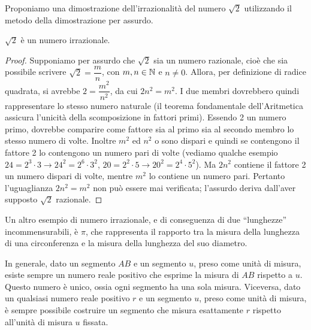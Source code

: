 \begin{enumerate}
Proponiamo una dimostrazione dell'irrazionalità del numero $\sqrt{2}$ utilizzando il metodo della dimostrazione per assurdo.

\begin{teorema}
$\sqrt{2}$ è un numero irrazionale.
\end{teorema}

\begin{proof}
Supponiamo per assurdo che $\sqrt{2}$ sia un numero razionale, cioè che sia possibile scrivere $\sqrt{2}=\dfrac{m}{n}$, con $m,n \in \mathbb{N}$ e $n\neq 0$. Allora, per definizione di radice quadrata, si avrebbe $2=\dfrac{m^2}{n^2}$, da cui $2n^2=m^2$. I due membri dovrebbero quindi rappresentare lo stesso numero naturale (il teorema fondamentale dell'Aritmetica assicura l'unicità della scomposizione in fattori primi). Essendo 2 un numero primo, dovrebbe comparire come fattore sia al primo sia al secondo membro lo stesso numero di volte. Inoltre $m^2$ ed $n^2$ o sono dispari e quindi se contengono il fattore 2 lo contengono un numero pari di volte (vediamo qualche esempio $24=2^3\cdot3 \rightarrow 24^2=2^6\cdot3^2$, $20=2^2\cdot5 \rightarrow 20^2=2^4\cdot5^2$). Ma $2n^2$ contiene il fattore 2 un numero dispari di volte, mentre $m^2$ lo contiene un numero pari. Pertanto l'uguaglianza $2n^2=m^2$ non può essere mai verificata; l'assurdo deriva dall'aver supposto $\sqrt{2}$ razionale.
\end{proof}

Un altro esempio di numero irrazionale, e di conseguenza di due ``lunghezze'' incommensurabili, è $\pi$, che rappresenta il rapporto tra la misura della lunghezza di una circonferenza e la misura della lunghezza del suo diametro.
\end{enumerate}

In generale, dato un segmento $AB$ e un segmento $u$, preso come unità di misura, esiste sempre un numero reale positivo che esprime la misura di $AB$ rispetto a $u$. Questo numero è unico, ossia ogni segmento ha una sola misura. Viceversa, dato un qualsiasi numero reale positivo $r$ e un segmento $u$, preso come unità di misura, è sempre possibile costruire un segmento che misura esattamente $r$ rispetto all'unità di misura $u$ fissata.

